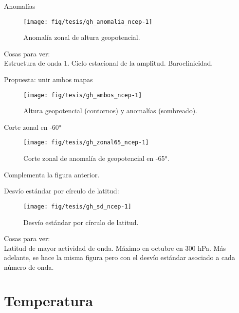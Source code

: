 \documentclass[spanish,a4paper]{book}
\begin{document}
Anomalías

\begin{figure}

{\centering \texttt{[image: fig/tesis/gh\_anomalia\_ncep-1]} 

}

\caption{Anomalía zonal de altura geopotencial.}\label{fig:gh_anomalia_ncep}
\end{figure}

Cosas para ver:\\
Estructura de onda 1. Ciclo estacional de la amplitud. Baroclinicidad.

Propuesta: unir ambos mapas

\begin{figure}

{\centering \texttt{[image: fig/tesis/gh\_ambos\_ncep-1]} 

}

\caption{Altura geopotencial (contornos) y anomalías (sombreado).}\label{fig:gh_ambos_ncep}
\end{figure}

Corte zonal en -60°

\begin{figure}

{\centering \texttt{[image: fig/tesis/gh\_zonal65\_ncep-1]} 

}

\caption{Corte zonal de anomalía de geopotencial en -65°.}\label{fig:gh_zonal65_ncep}
\end{figure}

Complementa la figura anterior.

Desvío estándar por círculo de latitud:

\begin{figure}

{\centering \texttt{[image: fig/tesis/gh\_sd\_ncep-1]} 

}

\caption{Desvío estándar por círculo de latitud.}\label{fig:gh_sd_ncep}
\end{figure}

Cosas para ver:\\
Latitud de mayor actividad de onda. Máximo en octubre en 300 hPa. Más
adelante, se hace la misma figura pero con el desvío estándar asociado a
cada número de onda.

\section{Temperatura}\label{temperatura}
\end{document}

